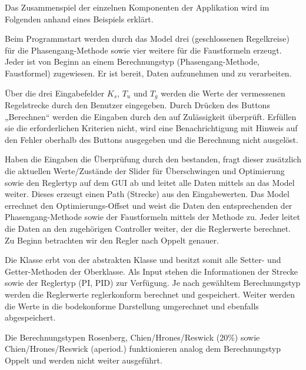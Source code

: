 Das Zusammenspiel der einzelnen Komponenten  der Applikation wird im Folgenden
anhand eines Beispiels erkl\"art.

Beim   Programmstart   werden   durch  das   Model   drei   
(geschlossenen Regelkreise)  f\"ur die  Phasengang-Methode sowie  vier weitere
f\"ur  die Faustformeln  erzeugt. Jeder   ist von  Beginn an
einem  Berechnungstyp  (Phasengang-Methode,  Faustformel)  zugewiesen. Er  ist
bereit, Daten aufzunehmen und zu verarbeiten.

\"Uber die  drei Eingabefelder  $K_s$, $T_u$  und $T_g$  werden die  Werte der
vermessenen Regelstrecke  durch den  Benutzer eingegeben. Durch  Dr\"ucken des
Buttons  „Berechnen“ werden  die Eingaben  durch den   auf
Zul\"assigkeit  \"uberpr\"uft. Erf\"ullen  sie  die  erforderlichen  Kriterien
nicht,  wird eine  Benachrichtigung mit  Hinweis auf  den Fehler  oberhalb des
Buttons ausgegeben und die Berechnung nicht ausgel\"ost.

Haben  die   Eingaben  die  \"Uberpr\"ufung  durch   den  
bestanden, fragt dieser zus\"atzlich die aktuellen Werte/Zust\"ande der Slider
f\"ur \"Uberschwingen und  Optimierung sowie den Reglertyp auf dem  GUI ab und
leitet  alle  Daten  mittels    an  das  Model  weiter. Dieses
erzeugt einen  Path (Strecke) aus  den Eingabewerten. Das Model  errechnet den
Optimierungs-Offset und weist die  Daten den entsprechenden 
der  Phasengang-Methode  sowie  der Faustformeln  mittels  der
Methode  zu. Jeder   leitet  die Daten  an den  zugeh\"origen
Controller weiter, der die Reglerwerte berechnet. Zu Beginn betrachten wir den
Regler nach Oppelt genauer.

Die  Klasse   erbt  von der  abstrakten Klasse  
und  besitzt  somit  alle  Setter-  und  Getter-Methoden  der  Oberklasse. Als
Input  stehen die  Informationen der  Strecke  sowie der  Reglertyp (PI,  PID)
zur  Verf\"ugung. Je nach  gew\"ahltem Berechnungstyp  werden die  Reglerwerte
reglerkonform  berechnet  und  gespeichert. Weiter  werden die  Werte  in  die
bodekonforme Darstellung umgerechnet und ebenfalls abgespeichert.

Die    Berechnungstypen   Rosenberg,    Chien/Hrones/Reswick   (20\%)    sowie
Chien/Hrones/Reswick (aperiod.) funktionieren analog dem Berechnungstyp Oppelt
und werden nicht weiter ausgef\"uhrt.

